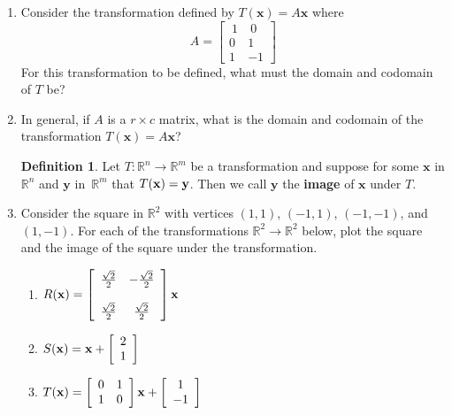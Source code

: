 \documentclass[12pt]{amsart}
\newcommand{\R}{\mathbb{R}}
\theoremstyle{definition}
\newtheorem*{definition}{Definition}
\begin{document}
\begin{enumerate}[itemsep=2.5em,leftmargin=0pt]

\item Consider the transformation defined by $T(\mathbf{x}) = A\mathbf{x}$ where 
\[
    A = \left[\begin{array}{rr}
        ~1 & ~0 \\
        0 & 1 \\
        1 & -1
    \end{array}\right]
\]
For this transformation to be defined, what must the domain and codomain of $T$ be?


\item In general, if $A$ is a $r\times c$ matrix, what is the domain and codomain of the transformation $T(\mathbf{x})= A\mathbf{x}$?

\vspace{2.5em}

\begin{definition}
    Let $T:\R^n\to\R^m$ be a transformation and suppose for some $\mathbf{x}$ in $\R^n$ and $\mathbf{y}$ in~$\R^m$ that $T({\bf x})={\bf y}$. Then we call $\mathbf{y}$ the \textbf{image} of $\mathbf{x}$ under $T$.
\end{definition}


\item Consider the square in $\R^2$ with vertices $(1,1)$, $(-1,1)$, $(-1,-1)$, and $(1,-1)$. For each of the transformations $\R^2\to\R^2$ below, plot the square and the image of the square under the transformation.
\begin{enumerate}
    \item $\displaystyle R({\bf x}) = \left[\begin{array}{cc} \frac{\sqrt{2}}{2} & -\frac{\sqrt{2}}{2} \\ ~ \\ \frac{\sqrt{2}}{2} & \frac{\sqrt{2}}{2} \end{array}\right] \mathbf{x} $\vspace{1em}
    \item $\displaystyle S({\bf x}) = \mathbf{x} + \left[\begin{array}{c} 2 \\ 1 \end{array}\right] $\vspace{1em}
    \item $\displaystyle T({\bf x}) = \left[\begin{array}{cc} 0 & 1 \\ 1 & 0 \end{array}\right] \mathbf{x} + \left[\begin{array}{c} 1 \\ -1 \end{array}\right] $
\end{enumerate}


\end{enumerate}
\end{document}
